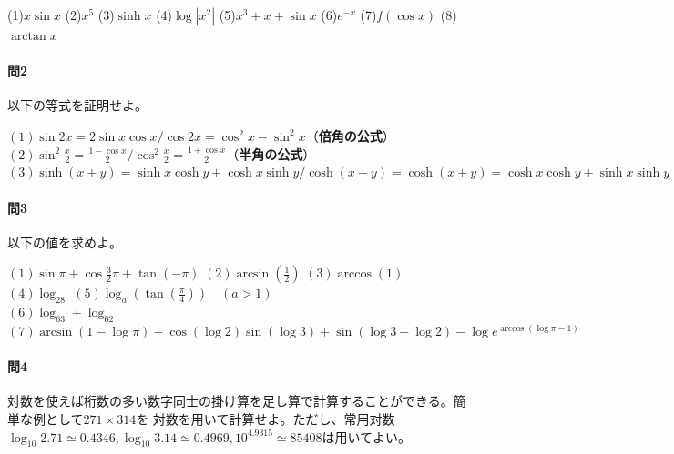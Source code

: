 \documentclass[a4j,dvipdfmx]{jsarticle}
\begin{document}
                \noindent
                (1)$x\sin x$\hspace{3mm}
                (2)$x^5$\hspace{3mm}
                (3)$\sinh x$\hspace{3mm}
                (4)$\log|x^2|$\hspace{3mm}
                (5)$x^3+x+\sin x$\hspace{3mm}
                (6)$e^{-x}$\hspace{3mm}
                (7)$f(\cos x)$\hspace{3mm}
                (8)$\arctan x$

                \paragraph{問2}以下の等式を証明せよ。

                \noindent
                $(1)\sin 2x=2\sin x\cos x/\cos 2x=\cos^2 x-\sin^2 x$（\textbf{倍角の公式}）\\
                $(2)\displaystyle \sin^2\frac{x}{2}=\frac{1-\cos x}{2}/\cos^2\frac{x}{2}=\frac{1+\cos x}{2}$（\textbf{半角の公式}）\\
                $(3)\sinh(x+y)=\sinh x\cosh y + \cosh x\sinh y/\cosh(x+y)=\cosh(x+y)=\cosh x\cosh y + \sinh x\sinh y$\\
                
                \paragraph{問3}以下の値を求めよ。

                \noindent
                $(1)\sin \pi+\cos \frac{3}{2}\pi + \tan(-\pi)$\hspace{3mm}
                $(2)\arcsin(\frac{1}{2})$\hspace{3mm}
                $(3)\arccos(1)$\hspace{3mm}
                $(4)\log_28$\hspace{3mm}
                $(5)\log_a(\tan(\frac{\pi}{4}))\quad(a>1)$\\
                $(6)\log_63+\log_62$\hspace{3mm}
                $(7)\arcsin(1-\log\pi)-\cos(\log2)\sin(\log 3)+\sin(\log3 -\log 2)-\log e^{\arccos(\log \pi-1)}$

                \paragraph{問4}対数を使えば桁数の多い数字同士の掛け算を足し算で計算することができる。簡単な例として$271\times 314$を
                対数を用いて計算せよ。ただし、常用対数$\log_{10} 2.71\simeq0.4346,\log_{10} 3.14\simeq0.4969,10^{4.9315}\simeq85408$は用いてよい。
                
\end{document}
